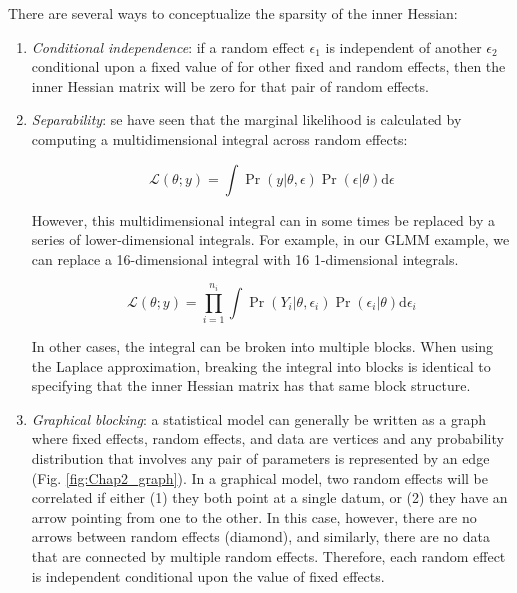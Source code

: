 There are several ways to conceptualize the sparsity of the inner Hessian:
\begin{enumerate}
    \item \textit{Conditional independence}:  if a random effect \(\epsilon_1\) is independent of another \(\epsilon_2\) conditional upon a fixed value of for other fixed and random effects, then the inner Hessian matrix will be zero for that pair of random effects.  

    \item \textit{Separability}:  se have seen that the marginal likelihood is calculated by computing a multidimensional integral across random effects:

\begin{equation}
    \mathcal{L}( \theta; y ) = \int \Pr(y | \theta, \epsilon) \Pr( \epsilon | \theta) \text{d}\epsilon  
\end{equation}
    
    However, this multidimensional integral can in some times be replaced by a series of lower-dimensional integrals.  For example, in our GLMM example, we can replace a 16-dimensional integral with 16 1-dimensional integrals.
    
\begin{equation}
    \mathcal{L}( \theta; y ) = \prod_{i=1}^{n_i} \int \Pr(Y_i | \theta, \epsilon_i) \Pr( \epsilon_i | \theta) \text{d}\epsilon_i 
\end{equation}
    
    In other cases, the integral can be broken into multiple blocks. When using the Laplace approximation, breaking the integral into blocks is identical to specifying that the inner Hessian matrix has that same block structure. 
    
    \item \textit{Graphical blocking}:  a statistical model can generally be written as a graph where fixed effects, random effects, and data are vertices and any probability distribution that involves any pair of parameters is represented by an edge (Fig. \ref{fig:Chap2_graph}).  In a graphical model, two random effects will be correlated if either (1) they both point at a single datum, or (2) they have an arrow pointing from one to the other.  In this case, however, there are no arrows between random effects (diamond), and similarly, there are no data that are connected by multiple random effects.  Therefore, each random effect is independent conditional upon the value of fixed effects.  
    

\end{enumerate}
